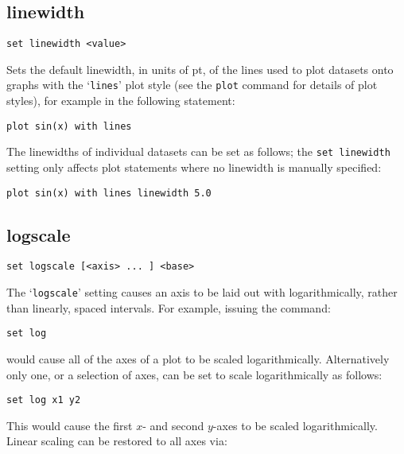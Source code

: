 \documentclass[a4paper,onecolumn,11pt]{book}
\begin{document}
\subsection{linewidth}

\begin{verbatim}
set linewidth <value>
\end{verbatim}

Sets the default linewidth, in units of pt, of the lines used to plot datasets
onto graphs with the `{\tt lines}' plot style (see the {\tt plot} command for
details of plot styles), for example in the following statement:

\begin{verbatim}
plot sin(x) with lines
\end{verbatim}

The linewidths of individual datasets can be set as follows; the {\tt set
linewidth} setting only affects plot statements where no linewidth is manually
specified:

\begin{verbatim}
plot sin(x) with lines linewidth 5.0
\end{verbatim}


\subsection{logscale}

\begin{verbatim}
set logscale [<axis> ... ] <base>
\end{verbatim}

The `{\tt logscale}' setting causes an axis to be laid out with logarithmically,
rather than linearly, spaced intervals.  For example, issuing the command:

\begin{verbatim}
set log
\end{verbatim}

\noindent would cause all of the axes of a plot to be scaled logarithmically. Alternatively
only one, or a selection of axes, can be set to scale logarithmically as
follows:

\begin{verbatim}
set log x1 y2
\end{verbatim}

This would cause the first $x$- and second $y$-axes to be scaled logarithmically.
Linear scaling can be restored to all axes via:
\end{document}
